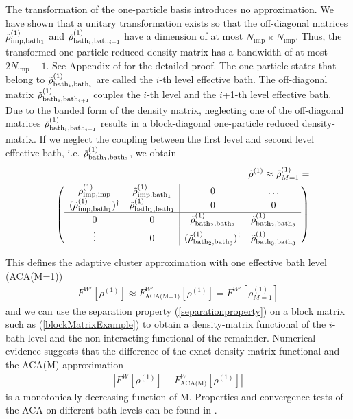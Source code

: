 \documentclass[%
 reprint,
nofootinbib,
 amsmath,amssymb,
 aps,
]{revtex4-2}
\begin{document}
The transformation of the one-particle basis introduces no approximation. We have shown that a unitary transformation exists so that the off-diagonal matrices $ \Tilde{\rho}^{(1)}_{\text{imp,bath$_1$}}$ and $ \Tilde{\rho}^{(1)}_{\text{bath$_i$,bath$_{i+1}$}}$ have a dimension of at most $N_{\text{imp}}\times N_{\text{imp}}$. Thus, the transformed one-particle reduced density matrix has a bandwidth of at most $2N_{\text{imp}}-1$. See Appendix of \cite{schade2019new} for the detailed proof. The one-particle states that belong to $\Tilde{\rho}^{(1)}_{\text{bath$_i$,bath$_{i}$}}$ are called the $i$-th level effective bath. The off-diagonal matrix $\Tilde{\rho}^{(1)}_{\text{bath$_i$,bath$_{i+1}$}}$ couples the $i$-th level and the $i$+1-th level effective bath. 
\break
Due to the banded form of the density matrix, neglecting one of the off-diagonal matrices $\Tilde{\rho}^{(1)}_{\text{bath$_i$,bath$_{i+1}$}}$ results in a block-diagonal one-particle reduced density-matrix. If we neglect the coupling between the first level and second level effective bath, i.e. $\Tilde{\rho}^{(1)}_{\text{bath$_1$,bath$_{2}$}}$, we obtain
\begin{eqnarray}
&&\Tilde{\rho}^{(1)}\approx \Tilde{\rho}^{(1)}_{M=1}=\\
&&\left(\begin{array}{cc|cc}
\rho^{(1)}_{\text{imp,imp}} & \Tilde{\rho}^{(1)}_{\text{imp,bath$_1$}} & 0  & \dots\\
(\Tilde{\rho}^{(1)}_{\text{imp,bath$_1$}})^\dagger & \Tilde{\rho}^{(1)}_{\text{bath$_1$,bath$_1$}} & 0 & 0\\\hline
0 & 0 & \Tilde{\rho}^{(1)}_{\text{bath$_2$,bath$_2$}} & \Tilde{\rho}^{(1)}_{\text{bath$_2$,bath$_3$}} \\
\vdots & 0 & (\Tilde{\rho}^{(1)}_{\text{bath$_2$,bath$_3$}})^\dagger & \Tilde{\rho}^{(1)}_{\text{bath$_3$,bath$_3$}}
\end{array}\right) \nonumber \\ \label{blockMatrixExample}
\end{eqnarray}

This defines the adaptive cluster approximation with one effective bath level (ACA(M=1))
\begin{eqnarray}
F^{W'}[\rho^{(1)}]\approx F^{W'}_{\text{ACA(M=1)}}[\rho^{(1)}] = F^{W'}[\rho^{(1)}_{M=1}]
\end{eqnarray}
and we can use the separation property (\ref{separationproperty}) on a block matrix such as (\ref{blockMatrixExample}) to obtain a density-matrix functional of the $i$-bath level and the non-interacting functional of the remainder. Numerical evidence suggests that the difference of the exact density-matrix functional and the ACA(M)-approximation 
\begin{eqnarray}
|F^{W}[\rho^{(1)}]-F^{W}_{\text{ACA(M)}}[\rho^{(1)}]|
\end{eqnarray}
is a monotonically decreasing function of M. Properties and convergence tests of the ACA on different bath levels can be found in \cite{schade2019new}. 
\end{document}
